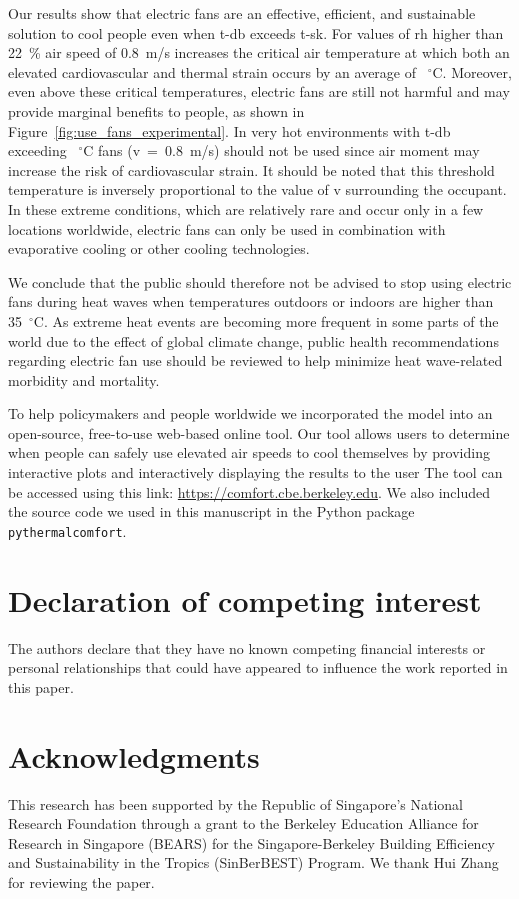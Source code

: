 Our results show that electric fans are an effective, efficient, and sustainable solution to cool people even when \ac{t-db} exceeds \ac{t-sk}.
For values of \ac{rh} higher than 22~\% air speed of 0.8~m/s increases the critical air temperature at which both an elevated cardiovascular and thermal strain occurs by an average of ~$^{\circ}$C\@.
Moreover, even above these critical temperatures, electric fans are still not harmful and may provide marginal benefits to people, as shown in Figure~\ref{fig:use_fans_experimental}.
In very hot environments with \ac{t-db} exceeding ~$^{\circ}$C fans (\acf{v}~=~0.8~m/s) should not be used since air moment may increase the risk of cardiovascular strain.
It should be noted that this threshold temperature is inversely proportional to the value of \ac{v} surrounding the occupant.
In these extreme conditions, which are relatively rare and occur only in a few locations worldwide, electric fans can only be used in combination with evaporative cooling or other cooling technologies.

We conclude that the public should therefore not be advised to stop using electric fans during heat waves when temperatures outdoors or indoors are higher than 35~$^{\circ}$C\@.
As extreme heat events are becoming more frequent in some parts of the world due to the effect of global climate change, public health recommendations regarding electric fan use should be reviewed to help minimize heat wave-related morbidity and mortality.

To help policymakers and people worldwide we incorporated the model into an open-source, free-to-use web-based online tool.
Our tool allows users to determine when people can safely use elevated air speeds to cool themselves by providing interactive plots and interactively displaying the results to the user
The tool can be accessed using this link: \url{https://comfort.cbe.berkeley.edu}.
We also included the source code we used in this manuscript in the Python package \verb|pythermalcomfort|.

\section{Declaration of competing interest}\label{sec:declaration-of-competing-interest}
The authors declare that they have no known competing financial interests or personal relationships that could have appeared to influence the work reported in this paper.

\section{Acknowledgments}\label{sec:acknowledgments}
This research has been supported by the Republic of Singapore's National Research Foundation through a grant to the Berkeley Education Alliance for Research in Singapore (BEARS) for the Singapore-Berkeley Building Efficiency and Sustainability in the Tropics (SinBerBEST) Program.
We thank Hui Zhang for reviewing the paper.